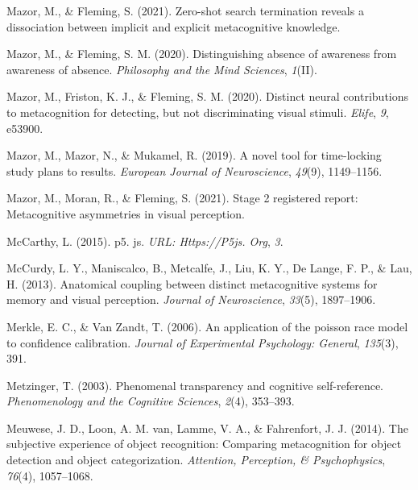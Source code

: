 \documentclass[12pt,twoside]{reedthesis}
\newenvironment{CSLReferences}%
  {}%
  {\par}
\begin{document}
\begin{CSLReferences}{1}{0}
\leavevmode\hypertarget{ref-mazor2021zero}{}%
Mazor, M., \& Fleming, S. (2021). Zero-shot search termination reveals a dissociation between implicit and explicit metacognitive knowledge.

\leavevmode\hypertarget{ref-mazor2020distinguishing}{}%
Mazor, M., \& Fleming, S. M. (2020). Distinguishing absence of awareness from awareness of absence. \emph{Philosophy and the Mind Sciences}, \emph{1}(II).

\leavevmode\hypertarget{ref-mazor2020distinct}{}%
Mazor, M., Friston, K. J., \& Fleming, S. M. (2020). Distinct neural contributions to metacognition for detecting, but not discriminating visual stimuli. \emph{Elife}, \emph{9}, e53900.

\leavevmode\hypertarget{ref-mazor2019novel}{}%
Mazor, M., Mazor, N., \& Mukamel, R. (2019). A novel tool for time-locking study plans to results. \emph{European Journal of Neuroscience}, \emph{49}(9), 1149--1156.

\leavevmode\hypertarget{ref-mazor2021stage}{}%
Mazor, M., Moran, R., \& Fleming, S. (2021). Stage 2 registered report: Metacognitive asymmetries in visual perception.

\leavevmode\hypertarget{ref-mccarthy2015p5}{}%
McCarthy, L. (2015). p5. js. \emph{URL: Https://P5js. Org}, \emph{3}.

\leavevmode\hypertarget{ref-mccurdy2013anatomical}{}%
McCurdy, L. Y., Maniscalco, B., Metcalfe, J., Liu, K. Y., De Lange, F. P., \& Lau, H. (2013). Anatomical coupling between distinct metacognitive systems for memory and visual perception. \emph{Journal of Neuroscience}, \emph{33}(5), 1897--1906.

\leavevmode\hypertarget{ref-merkle2006application}{}%
Merkle, E. C., \& Van Zandt, T. (2006). An application of the poisson race model to confidence calibration. \emph{Journal of Experimental Psychology: General}, \emph{135}(3), 391.

\leavevmode\hypertarget{ref-metzinger2003phenomenal}{}%
Metzinger, T. (2003). Phenomenal transparency and cognitive self-reference. \emph{Phenomenology and the Cognitive Sciences}, \emph{2}(4), 353--393.

\leavevmode\hypertarget{ref-meuwese2014subjective}{}%
Meuwese, J. D., Loon, A. M. van, Lamme, V. A., \& Fahrenfort, J. J. (2014). The subjective experience of object recognition: Comparing metacognition for object detection and object categorization. \emph{Attention, Perception, \& Psychophysics}, \emph{76}(4), 1057--1068.


\end{CSLReferences}
\end{document}

